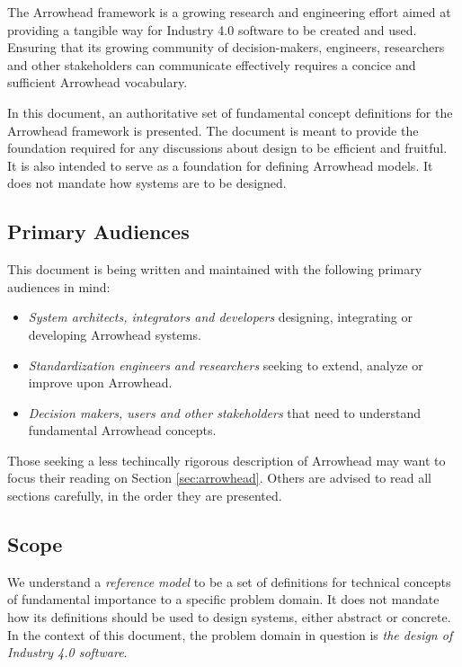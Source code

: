 %
%

The Arrowhead framework is a growing research and engineering effort aimed at providing a tangible way for Industry 4.0 software to be created and used.
Ensuring that its growing community of decision-makers, engineers, researchers and other stakeholders can communicate effectively requires a concice and sufficient Arrowhead vocabulary.

In this document, an authoritative set of fundamental concept definitions for the Arrowhead framework is presented.
The document is meant to provide the foundation required for any discussions about design to be efficient and fruitful.
It is also intended to serve as a foundation for defining Arrowhead models.
It does not mandate how systems are to be designed.

\subsection{Primary Audiences}
\label{sec:introduction:audiences}

This document is being written and maintained with the following primary audiences in mind:

\begin{itemize}
\item \textit{System architects, integrators and developers} designing, integrating or developing Arrowhead systems.
\item \textit{Standardization engineers and researchers} seeking to extend, analyze or improve upon Arrowhead.
\item \textit{Decision makers, users and other stakeholders} that need to understand fundamental Arrowhead concepts.
\end{itemize}

Those seeking a less techincally rigorous description of Arrowhead may want to focus their reading on Section \ref{sec:arrowhead}.
Others are advised to read all sections carefully, in the order they are presented.

\subsection{Scope}

We understand a \textit{reference model} to be a set of definitions for technical concepts of fundamental importance to a specific problem domain.
It does not mandate how its definitions should be used to design systems, either abstract or concrete.
In the context of this document, the problem domain in question is \textit{the design of Industry 4.0 software}.

